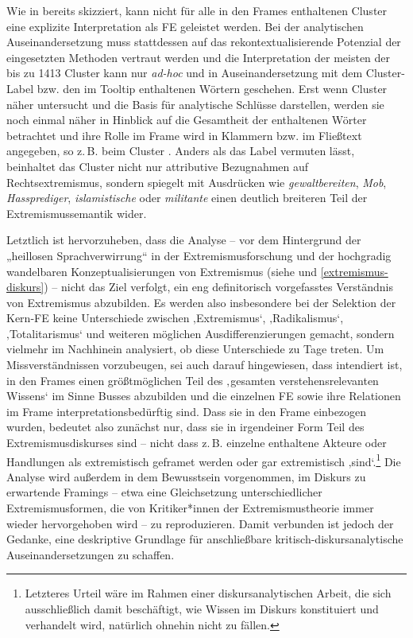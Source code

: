 Wie in  bereits skizziert, kann nicht für alle in den Frames enthaltenen Cluster eine explizite Interpretation als FE geleistet werden. Bei der analytischen Auseinandersetzung muss stattdessen auf das rekontextualisierende Potenzial \autocite{bubenhoferVisuelleLinguistikZur2020} der eingesetzten Methoden vertraut werden und die Interpretation der meisten der bis zu 1413 Cluster kann nur \emph{ad-hoc} und in Auseinandersetzung mit dem Cluster-Label bzw. den im Tooltip enthaltenen Wörtern geschehen. Erst wenn Cluster näher untersucht und die Basis für analytische Schlüsse darstellen, werden sie noch einmal näher in Hinblick auf die Gesamtheit der enthaltenen Wörter betrachtet und ihre Rolle im Frame wird in Klammern bzw. im Fließtext angegeben, so z.\,B. beim Cluster . Anders als das Label vermuten lässt, beinhaltet das Cluster nicht nur attributive Bezugnahmen auf Rechtsextremismus, sondern spiegelt mit Ausdrücken wie \emph{gewaltbereiten}, \emph{Mob}, \emph{Hassprediger}, \emph{islamistische} oder \emph{militante} einen deutlich breiteren Teil der Extremismussemantik wider.

\largerpage
Letztlich ist hervorzuheben, dass die Analyse -- vor dem Hintergrund der „heillosen Sprachverwirrung`` \autocite[49]{backesVergleichendeExtremismusforschung2005} in der Extremismusforschung und der hochgradig wandelbaren Konzeptualisierungen von Extremismus (siehe  und \ref{extremismus-diskurs}) -- nicht das Ziel verfolgt, ein eng definitorisch vorgefasstes Verständnis von Extremismus abzubilden. Es werden also insbesondere bei der Selektion der Kern-FE keine Unterschiede zwischen ‚Extremismus`, ‚Radikalismus`, ‚Totalitarismus` und weiteren möglichen Ausdifferenzierungen gemacht, sondern vielmehr im Nachhinein analysiert, ob diese Unterschiede zu Tage treten. Um Missverständnissen vorzubeugen, sei auch darauf hingewiesen, dass intendiert ist, in den Frames einen größtmöglichen Teil des ‚gesamten verstehensrelevanten Wissens` im Sinne Busses abzubilden und die einzelnen FE sowie ihre Relationen im Frame interpretationsbedürftig sind. Dass sie in den Frame einbezogen wurden, bedeutet also zunächst nur, dass sie in irgendeiner Form Teil des Extremismusdiskurses sind -- nicht dass z.\,B. einzelne enthaltene Akteure oder Handlungen als extremistisch geframet werden oder gar extremistisch ‚sind`.\footnote{Letzteres Urteil wäre im Rahmen einer diskursanalytischen Arbeit, die sich ausschließlich damit beschäftigt, wie Wissen im Diskurs konstituiert und verhandelt wird, natürlich ohnehin nicht zu fällen.} Die Analyse wird außerdem in dem Bewusstsein vorgenommen, im Diskurs zu erwartende Framings -- etwa eine Gleichsetzung unterschiedlicher Extremismusformen, die von Kritiker*innen der Extremismustheorie immer wieder hervorgehoben wird -- zu reproduzieren. Damit verbunden ist jedoch der Gedanke, eine deskriptive Grundlage für anschließbare kritisch-diskursanalytische Auseinandersetzungen zu schaffen.

